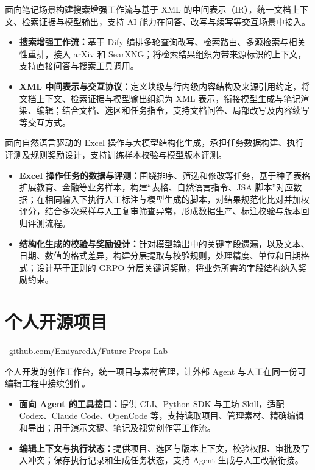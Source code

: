 \documentclass{resume}
\begin{document}
面向笔记场景构建搜索增强工作流与基于 XML 的中间表示（IR），统一文档上下文、检索证据与模型输出，支持 AI 能力在问答、改写与续写等交互场景中接入。
\begin{itemize}
  \item \textbf{搜索增强工作流：}基于 Dify 编排多轮查询改写、检索路由、多源检索与相关性重排，接入 arXiv 和 SearXNG；将检索结果组织为带来源标识的上下文，支持直接问答与搜索工具调用。
  \item \textbf{XML 中间表示与交互协议：}定义块级与行内级内容结构及来源引用约定，将文档上下文、检索证据与模型输出组织为 XML 表示，衔接模型生成与笔记渲染、编辑；结合文档、选区和任务指令，支持文档问答、局部改写及内容续写等交互方式。
\end{itemize}

面向自然语言驱动的 Excel 操作与大模型结构化生成，承担任务数据构建、执行评测及规则奖励设计，支持训练样本校验与模型版本评测。
\begin{itemize}
  \item \textbf{Excel 操作任务的数据与评测：}围绕排序、筛选和修改等任务，基于种子表格扩展教育、金融等业务样本，构建“表格、自然语言指令、JSA 脚本”对应数据；在相同输入下执行人工标注与模型生成的脚本，对结果规范化比对并加权评分，结合多次采样与人工复审筛查异常，形成数据生产、标注校验与版本回归评测流程。
  \item \textbf{结构化生成的校验与奖励设计：}针对模型输出中的关键字段遗漏，以及文本、日期、数值的格式差异，构建分层提取与校验规则，处理精度、单位和日期格式；设计基于正则的 GRPO 分层关键词奖励，将业务所需的字段结构纳入奖励约束。
\end{itemize}

\section{个人开源项目}
\href{https://github.com/EmiyaredA/Future-Props-Lab}{\faGithub\ github.com/EmiyaredA/Future-Props-Lab}

个人开发的创作工作台，统一项目与素材管理，让外部 Agent 与人工在同一份可编辑工程中接续创作。
\begin{itemize}
  \item \textbf{面向 Agent 的工具接口：}提供 CLI、Python SDK 与工坊 Skill，适配 Codex、Claude Code、OpenCode 等，支持读取项目、管理素材、精确编辑和导出；用于演示文稿、笔记及视觉创作等工作流。
  \item \textbf{编辑上下文与执行状态：}提供项目、选区与版本上下文，校验权限、审批及写入冲突；保存执行记录和生成任务状态，支持 Agent 生成与人工改稿衔接。
\end{itemize}
\end{document}
